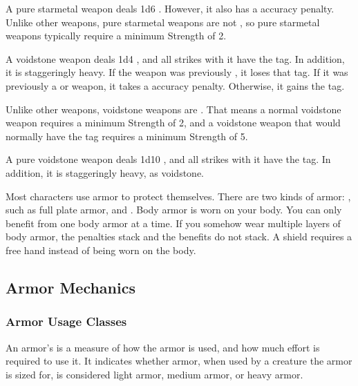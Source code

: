        A pure starmetal weapon deals 1d6 .
      However, it also has a  accuracy penalty.
      Unlike other weapons, pure starmetal weapons are not , so  pure starmetal weapons typically require a minimum Strength of 2.

       A voidstone weapon deals 1d4 , and all strikes with it have the \atEarth tag.
      In addition, it is staggeringly heavy.
      If the weapon was previously , it loses that tag.
      If it was previously a  or  weapon, it takes a  accuracy penalty.
      Otherwise, it gains the  tag.

      Unlike other weapons, voidstone weapons are .
      That means a normal voidstone weapon requires a minimum Strength of 2, and a voidstone weapon that would normally have the  tag requires a minimum Strength of 5.

       A pure voidstone weapon deals 1d10 , and all strikes with it have the \atEarth tag.
      In addition, it is staggeringly heavy, as voidstone.

\newpage
{}

  Most characters use armor to protect themselves. There are two kinds of armor: , such as full plate armor, and .
  Body armor is worn on your body.
  You can only benefit from one body armor at a time.
  If you somehow wear multiple layers of body armor, the penalties stack and the benefits do not stack.
  A shield requires a free hand instead of being worn on the body.

  \subsection{Armor Mechanics}

    \subsubsection{Armor Usage Classes}\label{Armor Usage Classes}
      An armor's  is a measure of how the armor is used, and how much effort is required to use it.
      It indicates whether armor, when used by a creature the armor is sized for, is considered light armor, medium armor, or heavy armor.

